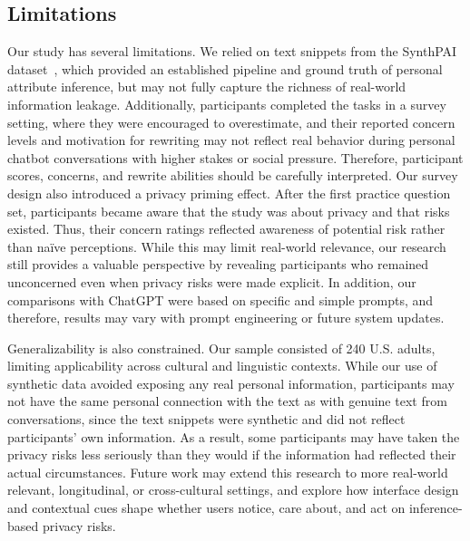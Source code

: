 \subsection{Limitations} \label{sec:limiation}
Our study has several limitations.
We relied on text snippets from the SynthPAI dataset~\cite{synthpai}, which provided an established pipeline and ground truth of personal attribute inference, but may not fully capture the richness of real-world information leakage. Additionally, participants completed the tasks in a survey setting, where they were encouraged to overestimate, and their reported concern levels and motivation for rewriting may not reflect real behavior during personal chatbot conversations with higher stakes or social pressure. Therefore, participant scores, concerns, and rewrite abilities should be carefully interpreted. Our survey design also introduced a privacy priming effect. After the first practice question set, participants became aware that the study was about privacy and that risks existed. Thus, their concern ratings reflected awareness of potential risk rather than naïve perceptions. While this may limit real-world relevance, our research still provides a valuable perspective by revealing participants who remained unconcerned even when privacy risks were made explicit. In addition, our comparisons with ChatGPT were based on specific and simple prompts, and therefore, results may vary with prompt engineering or future system updates. 

Generalizability is also constrained. Our sample consisted of 240 U.S. adults, limiting applicability across cultural and linguistic contexts. While our use of synthetic data avoided exposing any real personal information, participants may not have the same personal connection with the text as with genuine text from conversations, since the text snippets were synthetic and did not reflect participants’ own information. As a result, some participants may have taken the privacy risks less seriously than they would if the information had reflected their actual circumstances. Future work may extend this research to more real-world relevant, longitudinal, or cross-cultural settings, and explore how interface design and contextual cues shape whether users notice, care about, and act on inference-based privacy risks.

